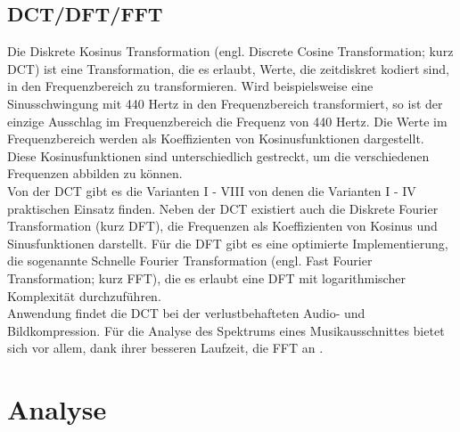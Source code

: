 \documentclass[11pt,a4paper]{article}
\begin{document}
\subsection{DCT/DFT/FFT}
Die Diskrete Kosinus Transformation (engl. Discrete Cosine Transformation; kurz DCT) ist eine Transformation, die es erlaubt, Werte, die zeitdiskret kodiert sind, in den Frequenzbereich zu transformieren. Wird beispielsweise eine Sinusschwingung mit 440 Hertz in den Frequenzbereich transformiert, so ist der einzige Ausschlag im Frequenzbereich die Frequenz von 440 Hertz. Die Werte im Frequenzbereich werden als Koeffizienten von Kosinusfunktionen dargestellt. Diese Kosinusfunktionen sind unterschiedlich gestreckt, um die verschiedenen Frequenzen abbilden zu können.\\
Von der DCT gibt es die Varianten I - VIII von denen die Varianten I - IV praktischen Einsatz finden. Neben der DCT existiert auch die Diskrete Fourier Transformation (kurz DFT), die Frequenzen als Koeffizienten von Kosinus und Sinusfunktionen darstellt. Für die DFT gibt es eine optimierte Implementierung, die sogenannte Schnelle Fourier Transformation (engl. Fast Fourier Transformation; kurz FFT), die es erlaubt eine DFT mit logarithmischer Komplexität durchzuführen.\\
Anwendung findet die DCT bei der verlustbehafteten Audio- und Bildkompression. Für die Analyse des Spektrums eines Musikausschnittes bietet sich vor allem, dank ihrer besseren Laufzeit, die FFT an \cite[S. 20 f.]{lerch2012introduction}.


\section{Analyse}
\end{document}
